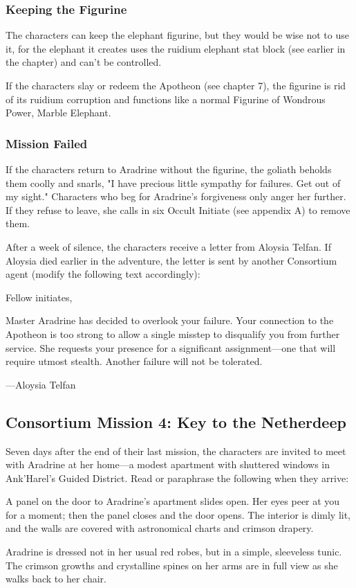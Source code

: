 \documentclass[10pt,a4paper,twoside,twocolumn,openany,nodeprecatedcode]{dndbook}
\begin{document}
\subsubsection{Keeping the Figurine}
The characters can keep the elephant figurine, but they would be wise not to use it, for the elephant it creates uses the ruidium elephant stat block (see earlier in the chapter) and can't be controlled.

If the characters slay or redeem the Apotheon (see chapter 7), the figurine is rid of its ruidium corruption and functions like a normal Figurine of Wondrous Power, Marble Elephant.

\subsubsection{Mission Failed}
If the characters return to Aradrine without the figurine, the goliath beholds them coolly and snarls, "I have precious little sympathy for failures. Get out of my sight." Characters who beg for Aradrine's forgiveness only anger her further. If they refuse to leave, she calls in six Occult Initiate (see appendix A) to remove them.

After a week of silence, the characters receive a letter from Aloysia Telfan. If Aloysia died earlier in the adventure, the letter is sent by another Consortium agent (modify the following text accordingly):

\begin{DndReadAloud}{}
Fellow initiates,

Master Aradrine has decided to overlook your failure. Your connection to the Apotheon is too strong to allow a single misstep to disqualify you from further service. She requests your presence for a significant assignment—one that will require utmost stealth. Another failure will not be tolerated.

—Aloysia Telfan

\end{DndReadAloud}

\subsection{Consortium Mission 4: Key to the Netherdeep}
Seven days after the end of their last mission, the characters are invited to meet with Aradrine at her home—a modest apartment with shuttered windows in Ank'Harel's Guided District. Read or paraphrase the following when they arrive:

\begin{DndReadAloud}{}
A panel on the door to Aradrine's apartment slides open. Her eyes peer at you for a moment; then the panel closes and the door opens. The interior is dimly lit, and the walls are covered with astronomical charts and crimson drapery.

Aradrine is dressed not in her usual red robes, but in a simple, sleeveless tunic. The crimson growths and crystalline spines on her arms are in full view as she walks back to her chair.

\end{DndReadAloud}
\end{document}
